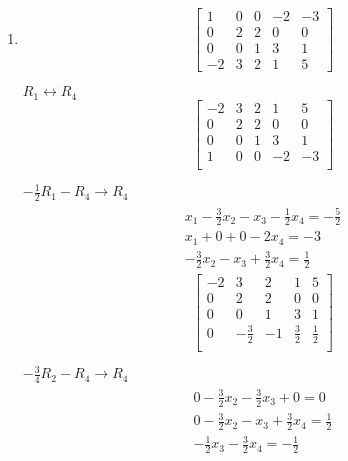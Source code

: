 \documentclass[12pt letter]{report}
\begin{document}
{\begin{enumerate}
          Because the system has a contradiction in row 3, $0x_1 + 0x_2 + 0x_3 = -1$, the system has no solution and is
          therefore inconsistent.

    \item
          \[
            \begin{bmatrix} 1 & 0 & 0 & -2 & -3 \\ 0 & 2 & 2 & 0 & 0 \\ 0 & 0 & 1 & 3 & 1 \\ -2 & 3 & 2 & 1 & 5 \end{bmatrix}
          \]

          $R_1 \leftrightarrow R_4$
          \[
            \begin{bmatrix}
              -2 & 3 & 2 & 1  & 5  \\
              0  & 2 & 2 & 0  & 0  \\
              0  & 0 & 1 & 3  & 1  \\
              1  & 0 & 0 & -2 & -3 \\
            \end{bmatrix}
          \]

          $-\frac{1}{2} R_1 - R_4 \to R_4$
          \begin{align*}
            \begin{split}
              x_1 - \frac{3}{2}x_2 - x_3 - \frac{1}{2}x_4 = -\frac{5}{2} \\
              x_1 + 0 + 0 - 2x_4 = -3                                    \\
              \hline
              -\frac{3}{2}x_2 - x_3 + \frac{3}{2}x_4 = \frac{1}{2}
            \end{split}
          \end{align*}
          \[
            \begin{bmatrix}
              -2 & 3            & 2  & 1           & 5           \\
              0  & 2            & 2  & 0           & 0           \\
              0  & 0            & 1  & 3           & 1           \\
              0  & -\frac{3}{2} & -1 & \frac{3}{2} & \frac{1}{2} \\
            \end{bmatrix}
          \]

          $-\frac{3}{4}R_2 - R_4 \to R_4$
          \begin{align*}
            \begin{split}
              0  -\frac{3}{2}x_2 - \frac{3}{2}x_3 + 0 = 0             \\
              0 - \frac{3}{2}x_2 - x_3 + \frac{3}{2}x_4 = \frac{1}{2} \\
              \hline
              -\frac{1}{2}x_3 - \frac{3}{2}x_4 = -\frac{1}{2}
            \end{split}
          \end{align*}


\end{enumerate}}
\end{document}
